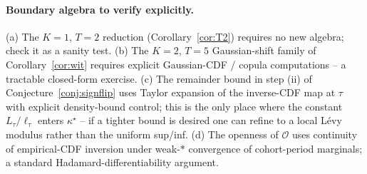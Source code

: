 \documentclass[11pt]{article}
\theoremstyle{definition}
\theoremstyle{plain}
\theoremstyle{remark}
\begin{document}
\paragraph{Boundary algebra to verify explicitly.} (a) The $K = 1$, $T = 2$ reduction (Corollary~\ref{cor:T2}) requires no new algebra; check it as a sanity test. (b) The $K = 2$, $T = 5$ Gaussian-shift family of Corollary~\ref{cor:wit} requires explicit Gaussian-CDF / copula computations -- a tractable closed-form exercise. (c) The remainder bound in step (ii) of Conjecture~\ref{conj:signflip} uses Taylor expansion of the inverse-CDF map at $\tau$ with explicit density-bound control; this is the only place where the constant $L_\tau / \ell_\tau$ enters $\kappa^\star$ -- if a tighter bound is desired one can refine to a local L\'evy modulus rather than the uniform sup/inf. (d) The openness of $\mathcal{O}$ uses continuity of empirical-CDF inversion under weak-$*$ convergence of cohort-period marginals; a standard Hadamard-differentiability argument.
\end{document}
